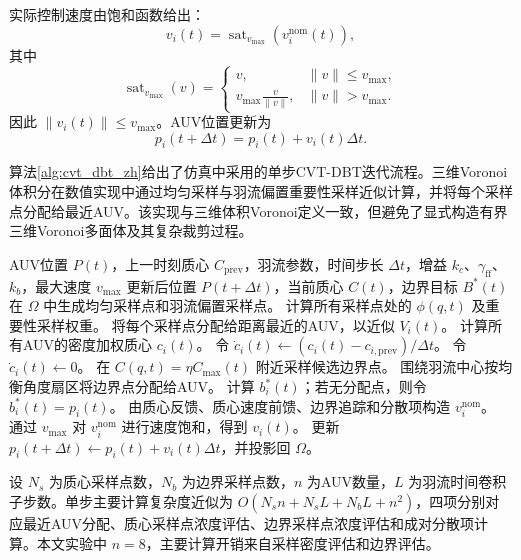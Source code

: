 \documentclass[conference]{IEEEtran}
\begin{document}
实际控制速度由饱和函数给出：
\begin{equation}
v_i(t)=\operatorname{sat}_{v_{\max}}(v_i^{\mathrm{nom}}(t)),
\end{equation}
其中
\begin{equation}
\operatorname{sat}_{v_{\max}}(v)=
\begin{cases}
v, & \|v\|\leq v_{\max},\\
v_{\max}\frac{v}{\|v\|}, & \|v\|>v_{\max}.
\end{cases}
\end{equation}
因此 $\|v_i(t)\|\leq v_{\max}$。AUV位置更新为
\begin{equation}
p_i(t+\Delta t)=p_i(t)+v_i(t)\Delta t.
\end{equation}

算法\ref{alg:cvt_dbt_zh}给出了仿真中采用的单步CVT-DBT迭代流程。三维Voronoi体积分在数值实现中通过均匀采样与羽流偏置重要性采样近似计算，并将每个采样点分配给最近AUV。该实现与三维体积Voronoi定义一致，但避免了显式构造有界三维Voronoi多面体及其复杂裁剪过程。

\begin{algorithm}[t]
\caption{动态水下溢油监测的CVT-DBT单步迭代}
\label{alg:cvt_dbt_zh}
\begin{algorithmic}[1]
\REQUIRE AUV位置 $P(t)$，上一时刻质心 $C_{\mathrm{prev}}$，羽流参数，时间步长 $\Delta t$，增益 $k_c$、$\gamma_{\mathrm{ff}}$、$k_b$，最大速度 $v_{\max}$
\ENSURE 更新后位置 $P(t+\Delta t)$，当前质心 $C(t)$，边界目标 $B^{\ast}(t)$
\STATE 在 $\Omega$ 中生成均匀采样点和羽流偏置采样点。
\STATE 计算所有采样点处的 $\phi(q,t)$ 及重要性采样权重。
\STATE 将每个采样点分配给距离最近的AUV，以近似 $V_i(t)$。
\STATE 计算所有AUV的密度加权质心 $c_i(t)$。
\STATE 令 $\dot c_i(t)\leftarrow(c_i(t)-c_{i,\mathrm{prev}})/\Delta t$。
\ELSE
\STATE 令 $\dot c_i(t)\leftarrow0$。
\ENDIF
\STATE 在 $C(q,t)=\eta C_{\max}(t)$ 附近采样候选边界点。
\STATE 围绕羽流中心按均衡角度扇区将边界点分配给AUV。
\STATE 计算 $b_i^{\ast}(t)$；若无分配点，则令 $b_i^{\ast}(t)=p_i(t)$。
\STATE 由质心反馈、质心速度前馈、边界追踪和分散项构造 $v_i^{\mathrm{nom}}$。
\STATE 通过 $v_{\max}$ 对 $v_i^{\mathrm{nom}}$ 进行速度饱和，得到 $v_i(t)$。
\STATE 更新 $p_i(t+\Delta t)\leftarrow p_i(t)+v_i(t)\Delta t$，并投影回 $\Omega$。
\end{algorithmic}
\end{algorithm}

设 $N_s$ 为质心采样点数，$N_b$ 为边界采样点数，$n$ 为AUV数量，$L$ 为羽流时间卷积子步数。单步主要计算复杂度近似为 $O(N_s n+N_sL+N_bL+n^2)$，四项分别对应最近AUV分配、质心采样点浓度评估、边界采样点浓度评估和成对分散项计算。本文实验中 $n=8$，主要计算开销来自采样密度评估和边界评估。
\end{document}
